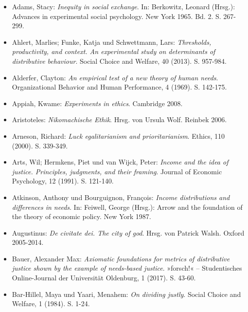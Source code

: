 \documentclass[a4paper]{thesis}
\begin{document}

\begin{itemize}[leftmargin=1.5em,label={},itemindent=-1.5em, itemsep=-1ex]
\item Adams, Stacy: \textit{Inequity in social exchange}. In: Berkowitz, Leonard (Hrsg.): Advances in experimental social psychology. New York 1965. Bd. 2. S. 267-299.

\item Ahlert, Marlies; Funke, Katja und Schwettmann, Lars: \textit{Thresholds, productivity, and context. An experimental study on determinants of distributive behaviour}. Social Choice and Welfare, 40 (2013). S. 957-984.

\item Alderfer, Clayton: \textit{An empirical test of a new theory of human needs}. Organizational Behavior and Human Performance, 4 (1969). S. 142-175.

\item Appiah, Kwame: \textit{Experiments in ethics}. Cambridge 2008. 

\item Aristoteles: \textit{Nikomachische Ethik}. Hrsg. von Ursula Wolf. Reinbek 2006.

\item Arneson, Richard: \textit{Luck egalitarianism and prioritarianism}. Ethics, 110 (2000). S. 339-349.

\item Arts, Wil; Hermkens, Piet und van Wijck, Peter: \textit{Income and the idea of justice. Principles, judgments, and their framing}. Journal of Economic Psychology, 12 (1991). S. 121-140.

\item Atkinson, Anthony und Bourguignon, François: \textit{Income distributions and differences in needs}. In: Feiwell, George (Hrsg.): Arrow and the foundation of the theory of economic policy. New York 1987.

\item Augustinus: \textit{De civitate dei. The city of god}. Hrsg. von Patrick Walsh. Oxford 2005-2014.

\item Bauer, Alexander Max: \textit{Axiomatic foundations for metrics of distributive justice shown by the example of needs-based justice}. »forsch!« – Studentisches Online-Journal der Universität Oldenburg, 1 (2017). S. 43-60.

\item Bar-Hillel, Maya und Yaari, Menahem: \textit{On dividing justly}. Social Choice and Welfare, 1 (1984). S. 1-24.


\end{itemize}
\end{document}

